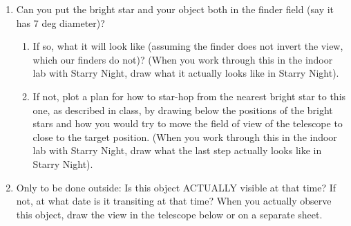 \documentclass[11pt, preprint]{aastex}
\begin{document}
\begin{enumerate}
\item Can you put the bright star and your object both in the finder
field (say it has 7 deg diameter)? 
\begin{enumerate}
\item If so,  what it will look like
(assuming the finder does not invert the view, which our finders do
not)? (When you work through this in the indoor lab with Starry Night,
draw what it actually looks like in Starry Night).
\vspace{180pt}
\clearpage
\item If not, plot a plan for how to star-hop from the nearest bright
star to this one, as described in class, by drawing below the
positions of the bright stars and how you would try to move the field
of view of the telescope to close to the target position. (When you
work through this in the indoor lab with Starry Night, draw what the
last step actually looks like in Starry Night).
\end{enumerate}
\vspace{220pt}
\item Only to be done outside: 
Is this object ACTUALLY visible at that time? If
not, at what date is it transiting at that time?
When you actually observe this object,
draw the view in the telescope below or on a separate sheet.
\end{enumerate}
\end{document}
